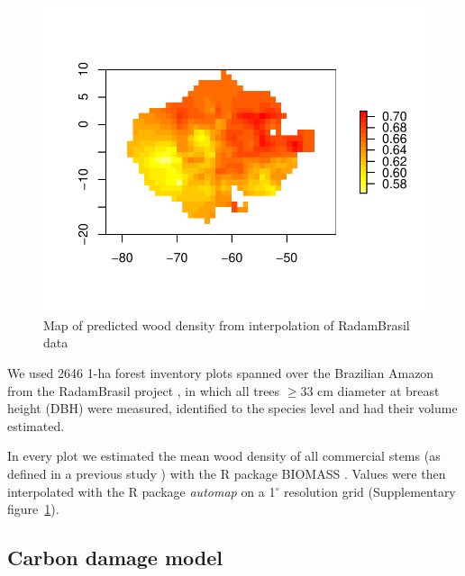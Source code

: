 \documentclass{article}
\begin{document}
\begin{figure}
    \centering
    \includegraphics[width=0.7\linewidth]{graphs/map_WDext.pdf}
    \caption{Map of predicted wood density from interpolation of RadamBrasil data}
    \label{sfig:wdext}
\end{figure}

We used 2646 1-ha forest inventory plots spanned over the Brazilian Amazon from the RadamBrasil project \cite{Radam2017}, in which all trees $\geq$33 cm diameter at breast height (DBH) were measured, identified to the species level and had their volume estimated. 

In every plot we estimated the mean wood density of all commercial stems (as defined in a previous study \cite{Piponiotc}) with the R package BIOMASS \cite{Rejou-Mechain2017}.
Values were then interpolated with the R package \textit{automap} \cite{gstat} on a 1$^{\circ}$ resolution grid (Supplementary figure~\ref{sfig:wdext}).


\subsection{Carbon damage model}
\label{supmat:cdam}
\end{document}
